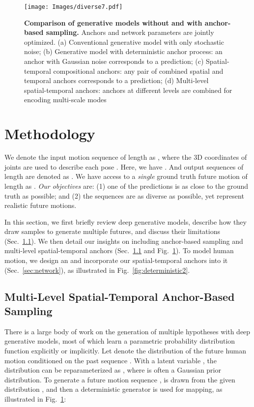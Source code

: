 \begin{figure}
\centering
\texttt{[image: Images/diverse7.pdf]}
\caption{\textbf{Comparison of generative models without and with anchor-based sampling.} Anchors and network parameters are jointly optimized. (a) Conventional generative model with only stochastic noise; (b) Generative model with deterministic anchor process: an anchor with Gaussian noise corresponds to a prediction; (c) Spatial-temporal compositional anchors: any pair of combined spatial and temporal anchors corresponds to a prediction; (d) Multi-level spatial-temporal anchors: anchors at different levels are combined for encoding multi-scale modes}
\label{fig:diverse}
\end{figure}

\section{Methodology}
\label{sec:method}

We denote the input motion sequence of length  as ,
where the 3D coordinates of  joints are used to describe each pose . 
Here, we have . 
And  output sequences of length  are denoted as . We have access to a {\em{single}} ground truth future motion of length  as .
{\it{Our objectives}} are: (1) one of the  predictions is as close to the ground truth as possible; and (2) the  sequences are as diverse as possible, yet represent realistic future motions.

In this section, we first briefly review deep generative models, describe how they draw samples to generate multiple futures, and discuss their limitations (Sec.~\ref{sec:shmp}). We then detail our insights on \oursanchor{} including anchor-based sampling and multi-level spatial-temporal anchors (Sec.~\ref{sec:shmp} and Fig.~\ref{fig:diverse}). To model human motion, we design an \oursmodel{} and incorporate our spatial-temporal anchors into it (Sec.~\ref{sec:network}), as illustrated in Fig.~\ref{fig:deterministic2}.

\subsection{Multi-Level Spatial-Temporal Anchor-Based Sampling}\label{sec:shmp}

There is a large body of work on the generation of multiple hypotheses with deep generative models, most of which learn a parametric probability distribution function explicitly or implicitly. Let  denote the distribution of the future human motion  conditioned on the past sequence . With a latent variable , the distribution can be reparameterized as , where  is often a Gaussian prior distribution. To generate a future motion sequence ,  is drawn from the given distribution , and then a deterministic generator  is used for mapping, as illustrated in Fig.~\ref{fig:diverse}{\color{red}{(a)}}: 

